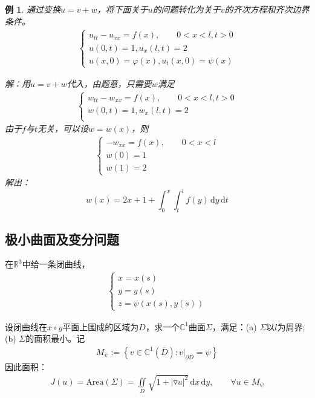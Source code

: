 \documentclass[11pt, a4paper]{article}
\theoremstyle{theorem}
\newtheorem{eg}[thm]{例}
\newcommand{\intd}[1]{\,\mathrm{d}{#1}}
\begin{document}
\begin{eg}
通过变换$u = v + w$，将下面关于$u$的问题转化为关于$v$的齐次方程和齐次边界条件。
\begin{align*}
\begin{cases}
u_{tt} - u_{xx} = f(x), \quad \quad 0 < x < l, t >0 \\
u(0,t) = 1, u_x(l,t) = 2 \\
u(x,0) = \varphi(x), u_t(x,0) = \psi(x)
\end{cases}
\end{align*}

解：用$u = v+w$代入，由题意，只需要$w$满足
\begin{align*}
\begin{cases}
w_{tt} - w_{xx} = f(x), \quad \quad 0 < x < l, t >0 \\
w(0,t) = 1, w_x(l,t) = 2 \\
\end{cases}
\end{align*}
由于$f$与$t$无关，可以设$w = w(x)$，则
\begin{align*}
\begin{cases}
- w_{xx} = f(x), \quad \quad 0 < x < l \\
w(0) = 1 \\
w(1) = 2
\end{cases}
\end{align*}
解出：
$$
w(x) = 2 x + 1 + \int_0^x \int_t^l f(y) \intd y \intd t
$$
\end{eg}

\subsection{极小曲面及变分问题}

在$\mathbb{R}^3$中给一条闭曲线，
\begin{align*}
\begin{cases}
x = x(s) \\
y = y(s) \\
z = \psi(x(s), y(s))
\end{cases}
\end{align*}

设闭曲线在$x \circ y$平面上围成的区域为$D$，求一个$\mathbb{C}^1$曲面$\Sigma$，满足：(a) $\Sigma$以$l$为周界; (b) $\Sigma$的面积最小。记
\begin{align}
    M_\psi := \left\{v \in \mathbb{C}^1 (\overline{D}): v |_{\partial D} = \psi\right\}
\end{align}
因此面积：
\begin{align}
    J(u) = \text{Area}(\Sigma) = \iint\limits_D  \sqrt{1 + |\triangledown u|^2} \intd x \intd y, \quad \quad \forall u \in M_\psi
\end{align}
\end{document}
